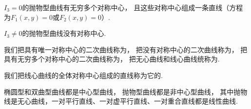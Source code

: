 \begin{theorem}
\(I_3 = 0\)的抛物型曲线有无穷多个对称中心，
且这些对称中心组成一条直线（方程为\(F_1(x,y) = 0\)或\(F_2(x,y) = 0\)）.
\end{theorem}

\begin{theorem}
\(I_3 \neq 0\)的抛物型曲线没有对称中心.
\end{theorem}

我们把具有唯一对称中心的二次曲线称为，
把没有对称中心的二次曲线称为，
把具有无穷多个对称中心的二次曲线称为，
把无心曲线和线心曲线统称为.

我们把线心曲线的全体对称中心组成的直线称为它的.

椭圆型和双曲型曲线都是中心型曲线，
抛物型曲线都是非中心型曲线，
其中抛物线是无心曲线，一对平行直线、一对虚平行直线、一对重合直线都是线性曲线.
